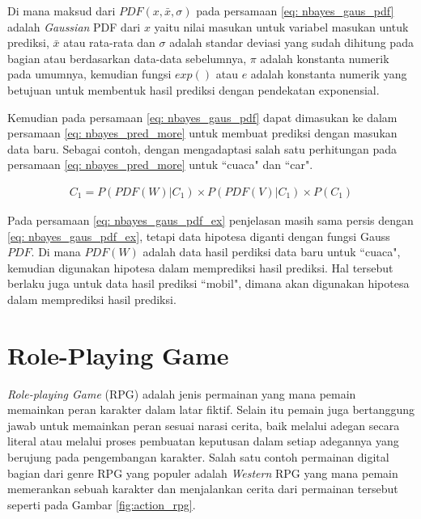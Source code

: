 \begin{subs}
\begin{enumerate}[label=\textbf{\arabic*).}]
		Di mana maksud dari $PDF(x, \bar{x}, \sigma)$ pada persamaan \ref{eq: nbayes_gaus_pdf} adalah \textit{Gaussian} PDF dari $x$ yaitu nilai masukan untuk variabel masukan untuk prediksi, $\bar x$ atau rata-rata dan $\sigma$ adalah standar deviasi yang sudah dihitung pada bagian atau berdasarkan data-data sebelumnya, $\pi$ adalah konstanta numerik pada umumnya, kemudian fungsi $exp()$ atau $e$ adalah konstanta numerik yang betujuan untuk membentuk hasil prediksi dengan pendekatan exponensial.
		\vspace{1ex}
		
		Kemudian pada persamaan \ref{eq: nbayes_gaus_pdf} dapat dimasukan ke dalam persamaan \ref{eq: nbayes_pred_more} untuk membuat prediksi dengan masukan data baru. Sebagai contoh, dengan mengadaptasi salah satu perhitungan pada persamaan \ref{eq: nbayes_pred_more} untuk ``cuaca" dan ``car".
		
		\begin{equation}\label{eq: nbayes_gaus_pdf_ex}
		\begin{split}
		C_{1} = P(PDF(W)|C_{1}) \times P(PDF(V)|C_{1}) \times P(C_{1})
		\end{split}
		\end{equation}
		
		Pada persamaan \ref{eq: nbayes_gaus_pdf_ex} penjelasan masih sama persis dengan \ref{eq: nbayes_gaus_pdf_ex}, tetapi data hipotesa diganti dengan fungsi Gauss $PDF$. Di mana $PDF(W)$ adalah data hasil perdiksi data baru untuk ``cuaca", kemudian digunakan hipotesa dalam memprediksi hasil prediksi. Hal tersebut berlaku juga untuk data hasil prediksi ``mobil", dimana akan digunakan hipotesa dalam memprediksi hasil prediksi.
	\end{enumerate}
\end{subs}

\section{Role-Playing Game}
\label{sec:sec2_rpg}
\vspace{1ex}

\textit{Role-playing Game} (RPG) \citep{Panumate2015} adalah jenis permainan yang mana pemain memainkan peran karakter dalam latar fiktif. Selain itu pemain juga bertanggung jawab untuk memainkan peran sesuai narasi cerita, baik melalui adegan secara literal atau melalui proses pembuatan keputusan dalam setiap adegannya yang berujung pada pengembangan karakter. Salah satu contoh permainan digital bagian dari genre RPG yang populer adalah \textit{Western} RPG yang mana pemain memerankan sebuah karakter dan menjalankan cerita dari permainan tersebut seperti pada Gambar \ref{fig:action_rpg}.
\vspace{2ex}

